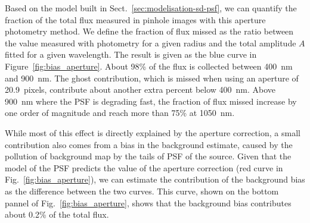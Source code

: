 Based on the model built in Sect.~\ref{sec:modelisation-sd-psf}, we can quantify the fraction of the total flux measured in \spinhole pinhole images with this aperture photometry method. We define the fraction of flux missed as the ratio between the value measured with photometry for a given radius and the total amplitude $A$ fitted for a given wavelength. The result is given as the blue curve in Figure~\ref{fig:bias_aperture}. About 98\% of the flux is collected between \SI{400}{\nano\meter} and \SI{900}{\nano\meter}. The ghost contribution, which is missed when using an aperture of \SI{20.9}{pixels}, contribute about another extra percent below \SI{400}{\nano\meter}. Above \SI{900}{\nano\meter} where the PSF is degrading fast, the fraction of flux missed increase by one order of magnitude and reach more than 75\% at \SI{1050}{nm}.

While most of this effect is directly explained by the aperture correction, a small contribution also comes from a bias in the background estimate, caused by the pollution of background map by the tails of PSF of the source. Given that the model of the PSF predicts the value of the aperture correction (red curve in Fig.~\ref{fig:bias_aperture}), we can estimate the contribution of the background bias as the difference between the two curves. This curve, shown on the bottom pannel of Fig.~\ref{fig:bias_aperture}, shows that the background bias contributes about 0.2\% of the total flux.

